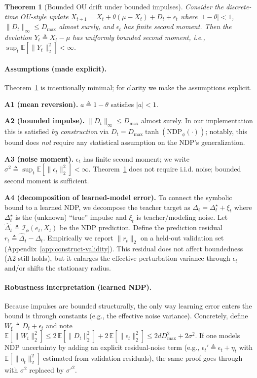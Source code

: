 \documentclass{article}
\newtheorem{theorem}{Theorem}
\begin{document}
\begin{theorem}[Bounded OU drift under bounded impulses]
\label{thm:stability}
Consider the discrete-time OU-style update
$X_{t+1} = X_t + \theta(\mu - X_t) + D_t + \epsilon_t$ where $|1-\theta|<1$, $\|D_t\|_\infty\le D_{\max}$ almost surely, and $\epsilon_t$ has finite second moment. Then the deviation $Y_t \triangleq X_t-\mu$ has uniformly bounded second moment, i.e., $\sup_t \mathbb{E}[\|Y_t\|_2^2] < \infty$.
\end{theorem}

\paragraph{Assumptions (made explicit).}
Theorem~\ref{thm:stability} is intentionally minimal; for clarity we make the assumptions explicit.

\noindent\textbf{A1 (mean reversion).} $a\triangleq 1-\theta$ satisfies $|a|<1$.

\noindent\textbf{A2 (bounded impulse).} $\|D_t\|_{\infty}\le D_{\max}$ almost surely. In our implementation this is satisfied \emph{by construction} via $D_t=D_{\max}\tanh(\mathrm{NDP}_\phi(\cdot))$; notably, this bound does \emph{not} require any statistical assumption on the NDP's generalization.

\noindent\textbf{A3 (noise moment).} $\epsilon_t$ has finite second moment; we write $\sigma^2\triangleq\sup_t\mathbb{E}[\|\epsilon_t\|_2^2]<\infty$. Theorem~\ref{thm:stability} does not require i.i.d. noise; bounded second moment is sufficient.

\noindent\textbf{A4 (decomposition of learned-model error).}
To connect the symbolic bound to a learned NDP, we decompose the teacher target as $\Delta_t=\Delta_t^{\star}+\xi_t$ where $\Delta_t^{\star}$ is the (unknown) ``true'' impulse and $\xi_t$ is teacher/modeling noise.
Let $\widehat{\Delta}_t\triangleq \mathcal{I}_\phi(e_t, X_t)$ be the NDP prediction. Define the prediction residual $r_t\triangleq \widehat{\Delta}_t-\Delta_t$.
Empirically we report $\|r_t\|_2$ on a held-out validation set (Appendix~\ref{app:construct-validity}). This residual does not affect boundedness (A2 still holds), but it enlarges the effective perturbation variance through $\epsilon_t$ and/or shifts the stationary radius.

\paragraph{Robustness interpretation (learned NDP).}
Because impulses are bounded structurally, the only way learning error enters the bound is through constants (e.g., the effective noise variance).
Concretely, define $W_t\triangleq D_t+\epsilon_t$ and note
$\mathbb{E}[\|W_t\|_2^2]\le 2\,\mathbb{E}[\|D_t\|_2^2]+2\,\mathbb{E}[\|\epsilon_t\|_2^2]\le 2dD_{\max}^2+2\sigma^2$.
If one models NDP uncertainty by adding an explicit residual-noise term (e.g., $\epsilon_t'\triangleq\epsilon_t+\eta_t$ with $\mathbb{E}[\|\eta_t\|_2^2]$ estimated from validation residuals), the same proof goes through with $\sigma^2$ replaced by $\sigma'^2$.
\end{document}
